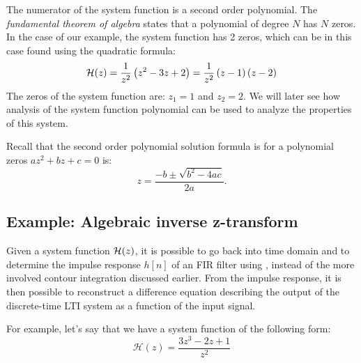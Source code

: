   The numerator of the system function is a second order polynomial. The \emph{fundamental theorem of algebra}
  states that a polynomial of degree $N$ has $N$ zeros. In the case of our example,
  the system function has 2 zeros, which can be in this case found using the quadratic formula:
  \begin{equation}
    \mathcal{H}(z) = \frac{1}{z^2}\left(z^2 -3z + 2 \right) = \frac{1}{z^2}\left(z-1\right)\left(z-2\right)
  \end{equation}
  The zeros of the system function are: $z_1=1$ and $z_2=2$. We will later see how analysis
  of the system function polynomial can be used to analyze the properties of this system.

  Recall that the second order polynomial solution formula is for
  a polynomial zeros $a z^2 + bz + c=0$ is:
  \begin{equation}
    z = \frac{-b \pm \sqrt{b^2-4ac}}{2a}.
  \end{equation}

\fi

\subsection{Example: Algebraic inverse z-transform}

Given a system function $\mathcal{H}(z)$, it is possible to go back into time
domain and to determine the impulse response $h[n]$ of an FIR filter
using , instead of the more involved contour integration
discussed earlier. From the impulse response, it is then possible to
reconstruct a difference equation describing the output of the
discrete-time LTI system as a function of the input signal.

For example, let's say that we have a system function of the following form:
\begin{equation}
  \mathcal{H}(z) = \frac{3z^{3} - 2 z + 1}{z^{2}}
  \label{eq:poly_ex}
\end{equation}


